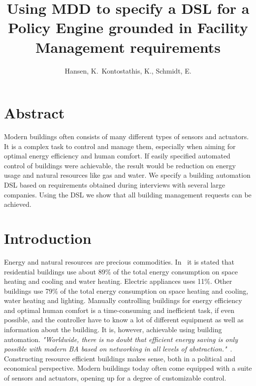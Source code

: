 \documentclass{llncs}
\begin{document}
\frontmatter
\pagestyle{headings}
\title{Using MDD to specify a DSL for a Policy Engine grounded in Facility Management requirements}
\author{Hansen, K.\, Kontostathis, K., Schmidt, E.}
\maketitle

\section{Abstract}
Modern buildings often consists of many different types of sensors and actuators. It is a complex task to control and manage them, especially when aiming for optimal energy efficiency and human comfort. If easily specified automated control of buildings were achievable, the result would be reduction on energy usage and natural resources like gas and water. We specify a building automation DSL based on requirements obtained during interviews with several large companies. Using the DSL we show that all building management requests can be achieved.

\section{Introduction}
Energy and natural resources are precious commodities. In~\cite{janssen2004towards} it is stated that residential buildings use about 89\% of the total energy consumption on space heating and cooling and water heating. Electric appliances uses 11\%. Other buildings use 79\% of the total energy consumption on space heating and cooling, water heating and lighting. Manually controlling buildings for energy efficiency and optimal human comfort is a time-consuming and inefficient task, if even possible, and the controller have to know a lot of different equipment as well as information about the building. It is, however, achievable using building automation. \textit{"Worldwide, there is no doubt that efficient energy saving is only possible with modern BA based on networking in all levels of abstraction."}~\cite{dietrich2010communication}. Constructing resource efficient buildings makes sense, both in a political and economical perspective. Modern buildings today often come equipped with a suite of sensors and actuators, opening up for a degree of customizable control.
\end{document}
